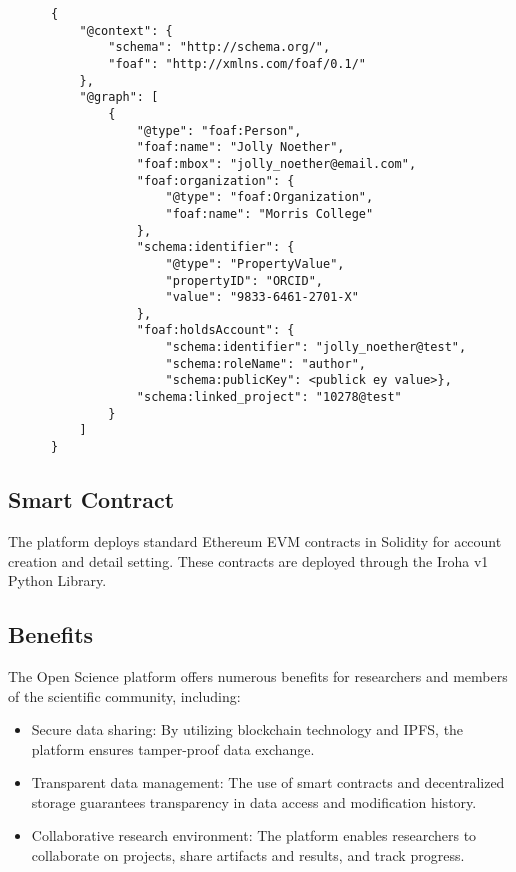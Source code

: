 \documentclass{article}
\begin{document}
\begin{verbatim}
      {
          "@context": {
              "schema": "http://schema.org/",
              "foaf": "http://xmlns.com/foaf/0.1/"
          },
          "@graph": [
              {
                  "@type": "foaf:Person",
                  "foaf:name": "Jolly Noether",
                  "foaf:mbox": "jolly_noether@email.com",
                  "foaf:organization": {
                      "@type": "foaf:Organization",
                      "foaf:name": "Morris College"
                  },
                  "schema:identifier": {
                      "@type": "PropertyValue",
                      "propertyID": "ORCID",
                      "value": "9833-6461-2701-X"
                  },
                  "foaf:holdsAccount": {
                      "schema:identifier": "jolly_noether@test",
                      "schema:roleName": "author",
                      "schema:publicKey": <publick ey value>},
                  "schema:linked_project": "10278@test"
              }
          ]
      }
      \end{verbatim}




\subsection{Smart Contract}

The platform deploys standard Ethereum EVM contracts in Solidity for account creation and detail setting. These contracts are deployed through the Iroha v1 Python Library.

\subsection{Benefits}

The Open Science platform offers numerous benefits for researchers and members of the scientific community, including:

\begin{itemize}
    \item Secure data sharing: By utilizing blockchain technology and IPFS, the platform ensures tamper-proof data exchange.
    \item Transparent data management: The use of smart contracts and decentralized storage guarantees transparency in data access and modification history.
    \item Collaborative research environment: The platform enables researchers to collaborate on projects, share artifacts and results, and track progress.
\end{itemize}
\end{document}
